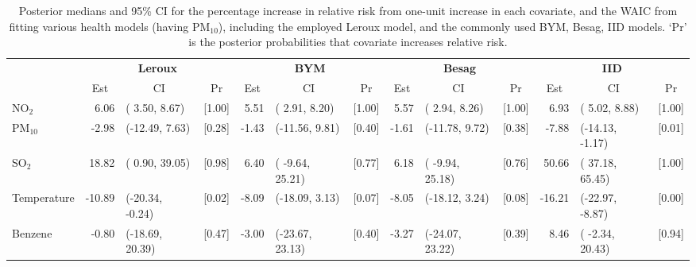 \documentclass[12,]{article}
\begin{document}
\begin{landscape}\begin{table}

\caption{\label{tab:monitoringModelpm10}Posterior medians and 95\% CI for the percentage increase in relative risk from one-unit increase in each covariate, and the WAIC from fitting various health models (having PM$_{10}$), including the employed Leroux model, and the commonly used BYM, Besag, IID models. `Pr' is the posterior probabilities that covariate increases relative risk.}
\centering
\fontsize{9}{11}\selectfont
\begin{tabular}[t]{lrlcrlcrlcrlc}
\toprule
\multicolumn{1}{c}{\textbf{ }} & \multicolumn{3}{c}{\textbf{Leroux}} & \multicolumn{3}{c}{\textbf{BYM}} & \multicolumn{3}{c}{\textbf{Besag}} & \multicolumn{3}{c}{\textbf{IID}} \\
\cmidrule(l{3pt}r{3pt}){2-4} \cmidrule(l{3pt}r{3pt}){5-7} \cmidrule(l{3pt}r{3pt}){8-10} \cmidrule(l{3pt}r{3pt}){11-13}
\multicolumn{1}{c}{ } & \multicolumn{1}{c}{Est} & \multicolumn{1}{c}{CI} & \multicolumn{1}{c}{Pr} & \multicolumn{1}{c}{Est} & \multicolumn{1}{c}{CI} & \multicolumn{1}{c}{Pr} & \multicolumn{1}{c}{Est} & \multicolumn{1}{c}{CI} & \multicolumn{1}{c}{Pr} & \multicolumn{1}{c}{Est} & \multicolumn{1}{c}{CI} & \multicolumn{1}{c}{Pr} \\
\cmidrule(l{3pt}r{3pt}){2-2} \cmidrule(l{3pt}r{3pt}){3-3} \cmidrule(l{3pt}r{3pt}){4-4} \cmidrule(l{3pt}r{3pt}){5-5} \cmidrule(l{3pt}r{3pt}){6-6} \cmidrule(l{3pt}r{3pt}){7-7} \cmidrule(l{3pt}r{3pt}){8-8} \cmidrule(l{3pt}r{3pt}){9-9} \cmidrule(l{3pt}r{3pt}){10-10} \cmidrule(l{3pt}r{3pt}){11-11} \cmidrule(l{3pt}r{3pt}){12-12} \cmidrule(l{3pt}r{3pt}){13-13}
NO$_2$ & 6.06 & (  3.50,   8.67) & [1.00] & 5.51 & (  2.91,   8.20) & [1.00] & 5.57 & (  2.94,   8.26) & [1.00] & 6.93 & (  5.02,   8.88) & [1.00]\\
PM$_{10}$ & -2.98 & (-12.49,   7.63) & [0.28] & -1.43 & (-11.56,   9.81) & [0.40] & -1.61 & (-11.78,   9.72) & [0.38] & -7.88 & (-14.13,  -1.17) & [0.01]\\
SO$_2$ & 18.82 & (  0.90,  39.05) & [0.98] & 6.40 & ( -9.64,  25.21) & [0.77] & 6.18 & ( -9.94,  25.18) & [0.76] & 50.66 & ( 37.18,  65.45) & [1.00]\\
Temperature & -10.89 & (-20.34,  -0.24) & [0.02] & -8.09 & (-18.09,   3.13) & [0.07] & -8.05 & (-18.12,   3.24) & [0.08] & -16.21 & (-22.97,  -8.87) & [0.00]\\
Benzene & -0.80 & (-18.69,  20.39) & [0.47] & -3.00 & (-23.67,  23.13) & [0.40] & -3.27 & (-24.07,  23.22) & [0.39] & 8.46 & ( -2.34,  20.43) & [0.94]\\

\end{tabular}
\end{table}
\end{landscape}
\end{document}
